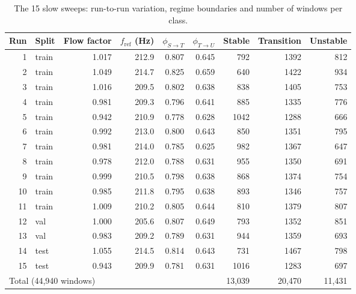 \begin{table}[H]\centering\footnotesize
\caption{The 15 slow sweeps: run-to-run variation, regime boundaries and number of windows per class.}\label{tab:runs}
\begin{tabular}{rlrrrrrrr}\toprule
Run & Split & Flow factor & $f_\mathrm{ref}$ (Hz) & $\phi_{S\to T}$ & $\phi_{T\to U}$ & Stable & Transition & Unstable \\\midrule
1 & train & 1.017 & 212.9 & 0.807 & 0.645 & 792 & 1392 & 812 \\
2 & train & 1.049 & 214.7 & 0.825 & 0.659 & 640 & 1422 & 934 \\
3 & train & 1.016 & 209.5 & 0.802 & 0.638 & 838 & 1405 & 753 \\
4 & train & 0.981 & 209.3 & 0.796 & 0.641 & 885 & 1335 & 776 \\
5 & train & 0.942 & 210.9 & 0.778 & 0.628 & 1042 & 1288 & 666 \\
6 & train & 0.992 & 213.0 & 0.800 & 0.643 & 850 & 1351 & 795 \\
7 & train & 0.981 & 214.0 & 0.785 & 0.625 & 982 & 1367 & 647 \\
8 & train & 0.978 & 212.0 & 0.788 & 0.631 & 955 & 1350 & 691 \\
9 & train & 0.999 & 210.5 & 0.798 & 0.638 & 868 & 1374 & 754 \\
10 & train & 0.985 & 211.8 & 0.795 & 0.638 & 893 & 1346 & 757 \\
11 & train & 1.009 & 210.2 & 0.805 & 0.644 & 810 & 1379 & 807 \\
12 & val & 1.000 & 205.6 & 0.807 & 0.649 & 793 & 1352 & 851 \\
13 & val & 0.983 & 209.2 & 0.789 & 0.631 & 944 & 1359 & 693 \\
14 & test & 1.055 & 214.5 & 0.814 & 0.643 & 731 & 1467 & 798 \\
15 & test & 0.943 & 209.9 & 0.781 & 0.631 & 1016 & 1283 & 697 \\
\midrule
\multicolumn{6}{l}{Total (44{,}940 windows)} & 13{,}039 & 20{,}470 & 11{,}431 \\
\bottomrule\end{tabular}
\end{table}